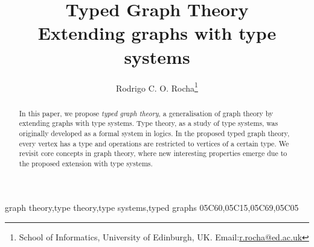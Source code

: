 \documentclass[preprint,12pt]{elsarticle}
\theoremstyle{plain}
\begin{document}
\begin{frontmatter}


\title{Typed Graph Theory\\Extending graphs with type systems}
\date{}




\author{Rodrigo C. O. Rocha\footnote{School of Informatics, University of Edinburgh, UK. Email:\url{r.rocha@ed.ac.uk}}}

\begin{abstract}
In this paper, we propose \textit{typed graph theory},
a generalisation of graph theory by extending
graphs with type systems.
Type theory, as a study of type systems,
was originally developed as a formal system in logics.
In the proposed typed graph theory, every vertex has a type
and operations are restricted to vertices of a certain type.
We revisit core concepts in graph theory, where
new interesting properties emerge due to the proposed
extension with type systems.
\end{abstract}

\begin{keyword}
graph theory\sep type theory\sep type systems\sep typed graphs
\MSC[2010] 05C60\sep 05C15\sep 05C69\sep 05C05
\end{keyword}

\end{frontmatter}
\end{document}

